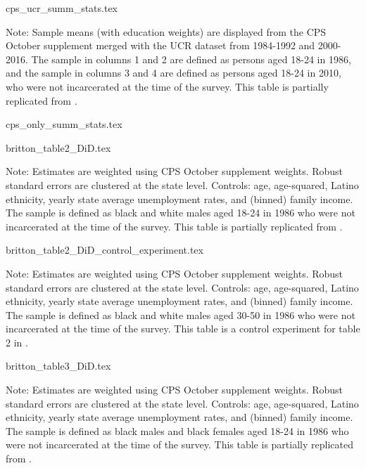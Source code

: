 
{cps_ucr_summ_stats.tex}

\begin{footnotesize}
  \noindent Note: Sample means (with education weights) are displayed from the CPS October supplement merged with the UCR dataset from 1984-1992 and 2000-2016. The sample in columns 1 and 2 are defined as persons aged 18-24 in 1986, and the sample in columns 3 and 4 are defined as persons aged 18-24 in 2010, who were not incarcerated at the time of the survey. This table is partially replicated from \cite{britton2022}.
\end{footnotesize}

{cps_only_summ_stats.tex}
\clearpage


{britton_table2_DiD.tex}
\begin{footnotesize}
  \noindent Note: Estimates are weighted using CPS October supplement weights. Robust standard errors are clustered at the state level. Controls: age, age-squared, Latino ethnicity, yearly state average unemployment rates, and (binned) family income. The sample is defined as black and white males aged 18-24 in 1986 who were not incarcerated at the time of the survey.
  This table is partially replicated from \cite{britton2022}.
\end{footnotesize}

{britton_table2_DiD_control_experiment.tex}
\begin{footnotesize}
  \noindent Note: Estimates are weighted using CPS October supplement weights. Robust standard errors are clustered at the state level. Controls: age, age-squared, Latino ethnicity, yearly state average unemployment rates, and (binned) family income. The sample is defined as black and white males aged 30-50 in 1986 who were not incarcerated at the time of the survey.
  This table is a control experiment for table 2 in \cite{britton2022}.
\end{footnotesize}
\clearpage

{britton_table3_DiD.tex}
\begin{footnotesize}
  \noindent Note: Estimates are weighted using CPS October supplement weights. Robust standard errors are clustered at the state level. Controls: age, age-squared, Latino ethnicity, yearly state average unemployment rates, and (binned) family income. The sample is defined as black males and black females aged 18-24 in 1986 who were not incarcerated at the time of the survey.
  This table is partially replicated from \cite{britton2022}.
\end{footnotesize}


